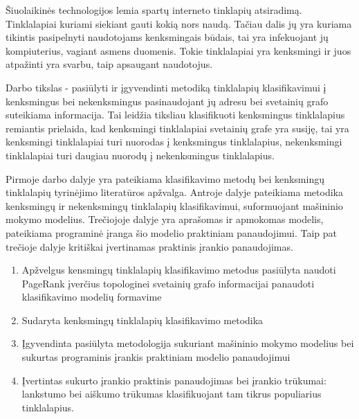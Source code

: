 \documentclass[12pt, a4paper, onecolumn, titlepage, oneside, intlimits]{report}
\begin{document}
\ktuinit{}    


Šiuolaikinės technologijos lemia spartų interneto tinklapių atsiradimą. Tinklalapiai kuriami siekiant gauti kokią nors naudą. Tačiau dalis jų yra kuriama tikintis pasipelnyti naudotojams kenksmingais būdais, tai yra infekuojant jų kompiuterius, vagiant asmens duomenis. Tokie tinklalapiai yra kenksmingi ir juos atpažinti yra svarbu, taip apsaugant naudotojus.

Darbo tikslas - pasiūlyti ir įgyvendinti metodiką tinklalapių klasifikavimui į kenksmingus bei nekenksmingus pasinaudojant jų adresu bei svetainių grafo suteikiama informacija. Tai leidžia tiksliau klasifikuoti kenksmingus tinklalapius remiantis prielaida, kad kenksmingi tinklalapiai svetainių grafe yra susiję, tai yra kenksmingi tinklalapiai turi nuorodas į kenksmingus tinklalapius, nekenksmingi tinklalapiai turi daugiau nuorodų į nekenksmingus tinklalapius.

Pirmoje darbo dalyje yra pateikiama klasifikavimo metodų bei kenksmingų tinklalapių tyrinėjimo literatūros apžvalga. Antroje dalyje pateikiama metodika kenksmingų ir nekenksmingų tinklalapių klasifikavimui, suformuojant mašininio mokymo modelius. Trečiojoje dalyje yra aprašomas ir apmokomas modelis, pateikiama programinė įranga šio modelio praktiniam panaudojimui. Taip pat trečioje dalyje kritiškai įvertinamas praktinis įrankio panaudojimas.

\newpage










\newpage




\newpage








\begin{enumerate}[label=\arabic*.]
\item Apžvelgus kensmingų tinklalapių klasifikavimo metodus pasiūlyta naudoti PageRank įverčius topologinei svetainių grafo informacijai panaudoti klasifikavimo modelių formavime
\item Sudaryta kenksmingų tinklalapių klasifikavimo metodika
\item Įgyvendinta pasiūlyta metodologija sukuriant mašininio mokymo modelius bei sukurtas programinis įrankis praktiniam modelio panaudojimui
\item Įvertintas sukurto įrankio praktinis panaudojimas bei įrankio trūkumai: lankstumo bei aiškumo trūkumas klasifikuojant tam tikrus populiarius tinklalapius.
\end{enumerate}
\end{document}
